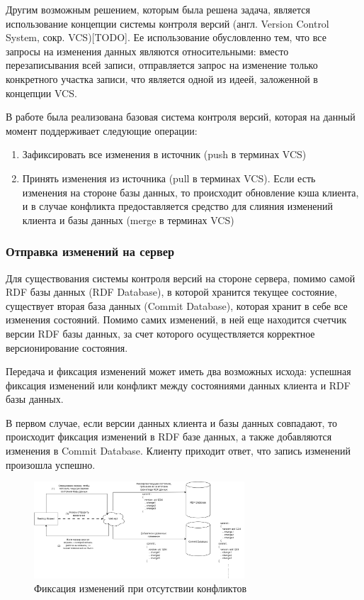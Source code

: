 \documentclass[12pt]{article}
\begin{document}
Другим возможным решением, которым была решена задача, является использование концепции системы контроля версий (англ. Version Control System, сокр. VCS)[TODO]. Ее использование обусловленно тем, что все запросы на изменения данных являются относительными: вместо перезаписывания всей записи, отправляется запрос на изменение только конкретного участка записи, что является одной из идеей, заложенной в концепции VCS.

В работе была реализована базовая система контроля версий, которая на данный момент поддерживает следующие операции:

\begin{enumerate}
    \item Зафиксировать все изменения в источник (push в терминах VCS)
    \item Принять изменения из источника (pull в терминах VCS). Если есть изменения на стороне базы данных, то происходит обновление кэша клиента, и в случае конфликта предоставляется средство для слияния изменений клиента и базы данных (merge в терминах VCS)
\end{enumerate}

\subsubsection{Отправка изменений на сервер}
\qquad Для существования системы контроля версий на стороне сервера, помимо самой RDF базы данных (RDF Database), в которой хранится текущее состояние, существует вторая база данных (Commit Database), которая хранит в себе все изменения состояний. Помимо самих изменений, в ней еще находится счетчик версии RDF базы данных, за счет которого осуществляется корректное версионирование состояния.

Передача и фиксация изменений может иметь два возможных исхода: успешная фиксация изменений или конфликт между состояниями данных клиента и RDF базы данных.

В первом случае, если версии данных клиента и базы данных совпадают, то происходит фиксация изменений в RDF базе данных, а также добавляются изменения в Commit Database. Клиенту приходит ответ, что запись изменений произошла успешно.

\begin{figure}[!ht]
    \centering
    \includegraphics[width=0.7\textwidth]{_images/if_merge_success.png}
    \caption{Фиксация изменений при отсутствии конфликтов}
    \label{fig:if_merge_success}
\end{figure}
\end{document}
